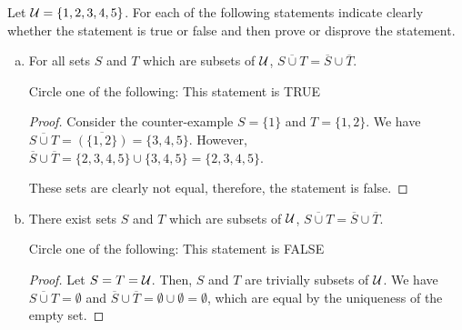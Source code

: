\question Let $\mathcal{U}=\{1,2,3,4,5\}$.
For each of the following statements indicate clearly whether the statement is
true or false and then prove or disprove the statement.
\begin{enumerate}[(a)]
  \item For all sets $S$ and $T$ which are subsets of $\mathcal{U}$, $\overline{S\cup T}=\overline{S}\cup\overline{T}$.

        Circle one of the following:
        \quad This statement is TRUE
        \quad {}

        \begin{proof}
          Consider the counter-example $S=\{1\}$ and $T=\{1,2\}$.
          We have $\overline{S\cup T} = \overline{(\{1,2\})} = \{3,4,5\}$.
          However, $\overline{S}\cup\overline{T} = \{2,3,4,5\} \cup \{3,4,5\} = \{2,3,4,5\}$.

          These sets are clearly not equal, therefore, the statement is false.
        \end{proof}
  \item There exist sets $S$ and $T$ which are subsets of $\mathcal{U}$, $\overline{S\cup T}=\overline{S}\cup\overline{T}$.

        Circle one of the following:
        \quad {}
        \quad This statement is FALSE

        \begin{proof}
          Let $S=T=\mathcal{U}$. Then, $S$ and $T$ are trivially subsets of $\mathcal{U}$.
          We have $\overline{S\cup T} = \emptyset$ and
          $\overline{S}\cup\overline{T}=\emptyset\cup\emptyset=\emptyset$,
          which are equal by the uniqueness of the empty set.
        \end{proof}
\end{enumerate}


